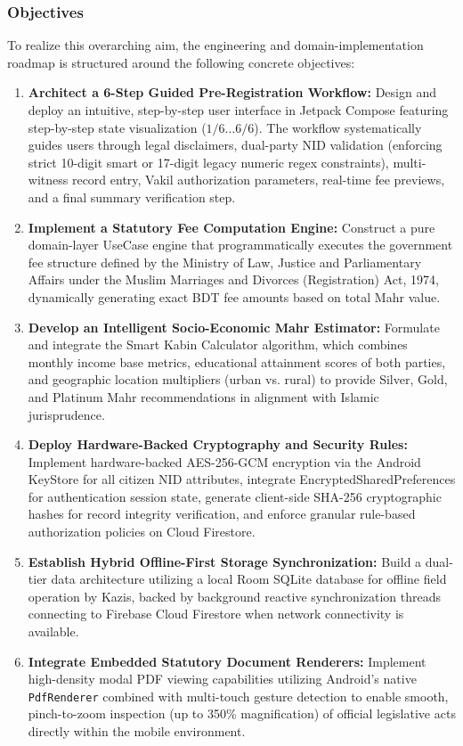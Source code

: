 \documentclass[12pt,a4paper]{article}
\begin{document}
	\subsubsection{Objectives}
	To realize this overarching aim, the engineering and domain-implementation roadmap is structured around the following concrete objectives:
	\begin{enumerate}
		\item \textbf{Architect a 6-Step Guided Pre-Registration Workflow:} Design and deploy an intuitive, step-by-step user interface in Jetpack Compose featuring step-by-step state visualization ($1/6 \dots 6/6$). The workflow systematically guides users through legal disclaimers, dual-party NID validation (enforcing strict 10-digit smart or 17-digit legacy numeric regex constraints), multi-witness record entry, Vakil authorization parameters, real-time fee previews, and a final summary verification step.
		\item \textbf{Implement a Statutory Fee Computation Engine:} Construct a pure domain-layer UseCase engine that programmatically executes the government fee structure defined by the Ministry of Law, Justice and Parliamentary Affairs under the Muslim Marriages and Divorces (Registration) Act, 1974, dynamically generating exact BDT fee amounts based on total Mahr value.
		\item \textbf{Develop an Intelligent Socio-Economic Mahr Estimator:} Formulate and integrate the Smart Kabin Calculator algorithm, which combines monthly income base metrics, educational attainment scores of both parties, and geographic location multipliers (urban vs. rural) to provide Silver, Gold, and Platinum Mahr recommendations in alignment with Islamic jurisprudence.
		\item \textbf{Deploy Hardware-Backed Cryptography and Security Rules:} Implement hardware-backed AES-256-GCM encryption via the Android KeyStore for all citizen NID attributes, integrate EncryptedSharedPreferences for authentication session state, generate client-side SHA-256 cryptographic hashes for record integrity verification, and enforce granular rule-based authorization policies on Cloud Firestore.
		\item \textbf{Establish Hybrid Offline-First Storage Synchronization:} Build a dual-tier data architecture utilizing a local Room SQLite database for offline field operation by Kazis, backed by background reactive synchronization threads connecting to Firebase Cloud Firestore when network connectivity is available.
		\item \textbf{Integrate Embedded Statutory Document Renderers:} Implement high-density modal PDF viewing capabilities utilizing Android's native \texttt{PdfRenderer} combined with multi-touch gesture detection to enable smooth, pinch-to-zoom inspection (up to 350\% magnification) of official legislative acts directly within the mobile environment.
	\end{enumerate}
	
\end{document}

